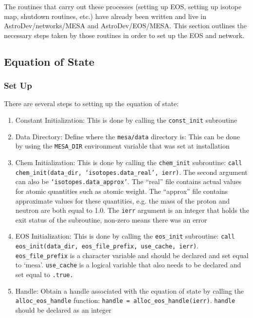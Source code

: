 The routines that carry out these processes (setting up EOS, setting up 
isotope map, shutdown routines, etc.) have already been written and live in 
{\sf AstroDev/networks/MESA} and {\sf AstroDev/EOS/MESA}. This section 
outlines the necessary steps taken by those routines in order to set up the 
EOS and network. 

 
\subsection{Equation of State}

\subsubsection{Set Up}

There are several steps to setting up the equation of state:
\begin{enumerate}
\item Constant Initialization: This is done by calling the {\tt const\_init} 
subroutine

\item Data Directory: Define where the {\tt mesa/data} directory is: This can 
be done by using the {\tt MESA\_DIR} environment variable that was set 
at installation

\item Chem Initialization: This is done by calling the {\tt chem\_init} 
subroutine: {\tt call chem\_init(data\_dir, `isotopes.data\_real', ierr)}. 
The second argument can also be {\tt `isotopes.data\_approx'}. The ``real'' 
file contains actual values for 
atomic quantities such as atomic weight. The ``approx'' file contains 
approximate values for these quantities, e.g. the mass of the proton and 
neutron are both equal to 1.0. The {\tt ierr} argument is an integer that 
holds the exit status of the subroutine, non-zero means there was an error

\item EOS Initialization: This is done by calling the {\tt eos\_init} 
subroutine: {\tt call eos\_init(data\_dir, eos\_file\_prefix, use\_cache, 
ierr)}. {\tt eos\_file\_prefix} is a character variable and should be 
declared and set equal to `mesa'. {\tt use\_cache} is a logical variable that 
also needs to be declared and set equal to {\tt .true.}

\item Handle: Obtain a handle associated with the equation of state by 
calling the {\tt alloc\_eos\_handle} function: 
{\tt handle = alloc\_eos\_handle(ierr)}. {\tt handle} should be declared as an 
integer
\end{enumerate}

